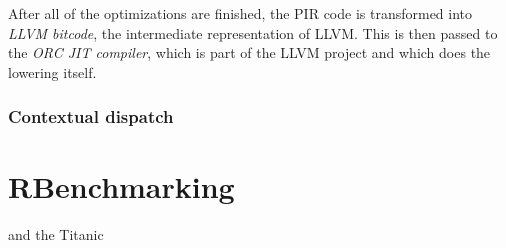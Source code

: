 After all of the optimizations are finished, the PIR code is transformed into \textit{LLVM bitcode}, the intermediate representation of LLVM. This is then passed to the \textit{ORC JIT compiler}, which is part of the LLVM project and which does the lowering itself.

\subsubsection*{Contextual dispatch}

\section{RBenchmarking}
and the Titanic
